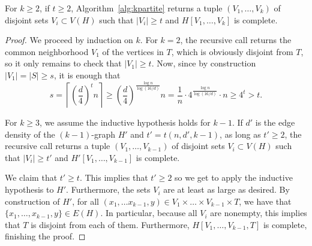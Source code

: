 \begin{theorem}
    For $k \geq 2$, if $t \geq 2$, Algorithm~\ref{alg:kpartite} returns a tuple $(V_1, \dots, V_k)$ of disjoint sets $V_i \subset V(H)$ such that
    $|V_i| \geq t$ and $H[V_1, \dots, V_k]$ is complete.

    \begin{proof}
        We proceed by induction on $k$.
        For $k=2$, the recursive call returns the common neighborhood $V_1$ of the vertices in $T$,
        which is obviously disjoint from $T$, so it only remains to check that $|V_1| \geq t$.
        Now, since by construction $|V_1| = |S| \geq s$, it is enough that
        \[
            s
            = \left\lceil \left( \frac{d}{4} \right)^t n \right\rceil
            \geq \left( \frac{d}{4} \right)^{\frac{\log n}{\log(16/d)}} n
            = \frac{1}{n} \cdot 4^{\frac{\log n}{\log(16/d)}} \cdot n
            \geq 4^t
            > t.
        \]

        For $k \geq 3$, we assume the inductive hypothesis holds for $k-1$.
        If $d'$ is the edge density of the $(k-1)$-graph $H'$
        and $t' = t(n, d', k-1)$, as long as $t' \geq 2$, the recursive call returns
        a tuple $(V_1, \dots, V_{k-1})$ of disjoint sets $V_i \subset V(H)$ such that
        $|V_i| \geq t'$ and $H'[V_1, \dots, V_{k-1}]$ is complete.

        We claim that $t' \geq t$.
        This implies that $t' \geq 2$ so we get to apply the inductive hypothesis to $H'$.
        Furthermore, the sets $V_i$ are at least as large as desired.
        By construction of $H'$, for all $(x_1, \dots x_{k-1}, y) \in V_1 \times \dots \times V_{k-1} \times T$,
        we have that $\{x_1, \dots, x_{k-1}, y\} \in E(H)$.
        In particular, because all $V_i$ are nonempty, this implies that $T$ is disjoint from each of them.
        Furthermore, $H[V_1, \dots, V_{k-1}, T]$ is complete, finishing the proof.


\end{proof}
\end{theorem}
